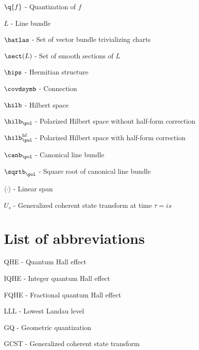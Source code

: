 \documentclass[notas.tex]{subfiles} 				%
\begin{document}
	$\q{f}$ - Quantization of $f$
	
	$L$ - Line bundle

	$\batlas$ - Set of vector bundle trivializing charts

	$\sect(L)$ - Set of smooth sections of $L$

	$\hips$ - Hermitian structure

	$\covdsymb$ - Connection

	$\hilb$ - Hilbert space

	$\hilb_\pol$ - Polarized Hilbert space without half-form correction

	$\hilb_\pol^\text{hf}$ - Polarized Hilbert space with half-form correction

	$\canb_\pol$ - Canonical line bundle

	$\sqrtb_\pol$ - Square root of canonical line bundle

	$\langle \cdot \rangle$ - Linear span

	$U_s$ - Generalized coherent state transform at time $\tau = is$

	\chapter*{List of abbreviations}
	QHE - Quantum Hall effect

	IQHE - Integer quantum Hall effect

	FQHE - Fractional quantum Hall effect

	LLL - Lowest Landau level

	GQ - Geometric quantization
	
	GCST - Generalized coherent state transform
\end{document}
